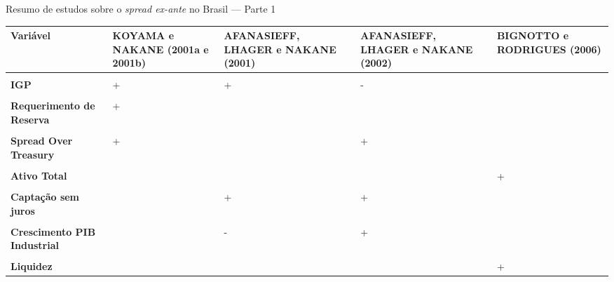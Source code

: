 \documentclass[
  12pt,
  12pt,
  openright,
  oneside,
  a4paper,
  chapter=TITLE,
  section=TITLE,
  subsection=TITLE,
  subsubsection=TITLE,
  english,
  portugues,
  sumario=tradicional]{abntex2}
\begin{document}
\begin{qdr}
\vspace{20pt}
\caption{Resumo de estudos sobre o \emph{spread ex-ante} no Brasil — Parte 1}
\vspace{1mm}
\begingroup\fontsize{10}{12}\selectfont

\begin{tabu} to 
\toprule
Variável & KOYAMA e NAKANE (2001a e 2001b) & AFANASIEFF, LHAGER e NAKANE (2001) & AFANASIEFF, LHAGER e NAKANE (2002) & BIGNOTTO e RODRIGUES (2006)\\
\midrule
\textbf{} &  &  &  & \\
\textbf{IGP} & + & + & - & \\
\textbf{} &  &  &  & \\
\textbf{Requerimento de Reserva} & + &  &  & \\
\textbf{} &  &  &  & \\
\addlinespace
\textbf{Spread Over Treasury} & + &  & + & \\
\textbf{} &  &  &  & \\
\textbf{Ativo Total} &  &  &  & +\\
\textbf{} &  &  &  & \\
\textbf{Captação sem juros} &  & + & + & \\
\addlinespace
\textbf{} &  &  &  & \\
\textbf{Crescimento PIB Industrial} &  & - & + & \\
\textbf{} &  &  &  & \\
\textbf{Liquidez} &  &  &  & +\\

\end{tabu}
\end{qdr}
\end{document}
